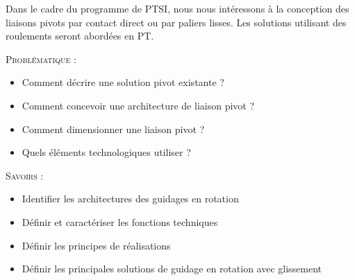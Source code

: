 \documentclass[11pt,oneside]{article}
\begin{document}
Dans le cadre du programme de PTSI, nous nous intéressons à la conception des liaisons pivots par contact direct ou par paliers lisses. Les solutions utilisant des roulements seront abordées en PT. 

%
%

\begin{prob}
\textsc{Problématique :}
\begin{itemize}
\item Comment décrire une solution pivot existante ?
\item Comment concevoir une architecture de liaison pivot ?
\item Comment dimensionner une liaison pivot ?
\item Quels éléments technologiques utiliser ?
\end{itemize}
\end{prob}

\begin{savoir}
\textsc{Savoirs :}
\begin{itemize}
\item Identifier les architectures des guidages en rotation 
\item Définir et caractériser les fonctions techniques
\item Définir les principes de réalisations
\item Définir les principales solutions de guidage en rotation avec glissement
\end{itemize}
\end{savoir}

\newpage 

\setlength{\parskip}{0ex plus 0.2ex minus 0ex}
 \renewcommand{\contentsname}{}
 \renewcommand{\baselinestretch}{1}
\end{document}
